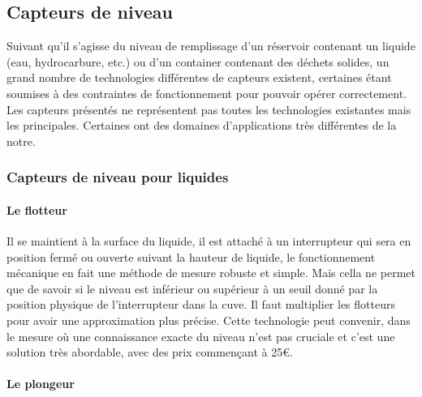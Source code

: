  



\subsection{Capteurs de niveau}

Suivant qu’il s’agisse du niveau de remplissage d’un réservoir contenant un liquide (eau, hydrocarbure, etc.) ou d’un container contenant des déchets solides, un grand nombre de technologies différentes de capteurs existent, certaines étant soumises à des contraintes de fonctionnement pour pouvoir opérer correctement.
Les capteurs présentés ne représentent pas toutes les technologies existantes mais les principales. Certaines ont des domaines d'applications très différentes de la notre.

\subsubsection{Capteurs de niveau pour liquides}

\paragraph{Le flotteur}

Il se maintient à la surface du liquide, il est attaché à un interrupteur qui sera en position fermé ou ouverte suivant la hauteur de liquide, le fonctionnement mécanique en fait une méthode de mesure robuste et simple. Mais cella ne permet que de savoir si le niveau est inférieur ou supérieur à un seuil donné par la position physique de l'interrupteur dans la cuve. Il faut multiplier les flotteurs pour avoir une approximation plus précise. Cette technologie peut convenir, dans le mesure où une connaissance exacte du niveau n'est pas cruciale et c'est une solution très abordable, avec des prix commençant à 25\euro\footnotemark.



\paragraph{Le plongeur}

